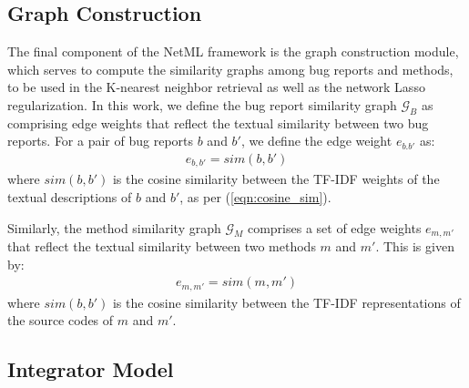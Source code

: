 \subsection{Graph Construction}
\label{subsec:graph}

The final component of the NetML framework is the graph construction module, which serves to compute the similarity graphs among bug reports and methods, to be used in the K-nearest neighbor retrieval as well as the network Lasso regularization. In this work, we define the bug report similarity graph $\mathcal{G}_B$ as comprising edge weights that reflect the textual similarity between two bug reports. For a pair of bug reports $b$ and $b'$, we define the edge weight $e_{b.b'}$ as:
\begin{align}
\label{eqn:edge_b}
e_{b,b'} = sim(b, b')
\end{align}
where $sim(b,b')$ is the cosine similarity between the TF-IDF weights of the textual descriptions of $b$ and $b'$, as per (\ref{eqn:cosine_sim}).


Similarly, the method similarity graph $\mathcal{G}_M$ comprises a set of edge weights $e_{m,m'}$ that reflect the textual similarity between two methods $m$ and $m'$. This is given by:
\begin{align}
\label{eqn:edge_m}
e_{m,m'} = sim(m, m')
\end{align}
where $sim(b,b')$ is the cosine similarity between the TF-IDF representations of the source codes of $m$ and $m'$.


\subsection{Integrator Model}
\label{sec.generalized_adaptive}


